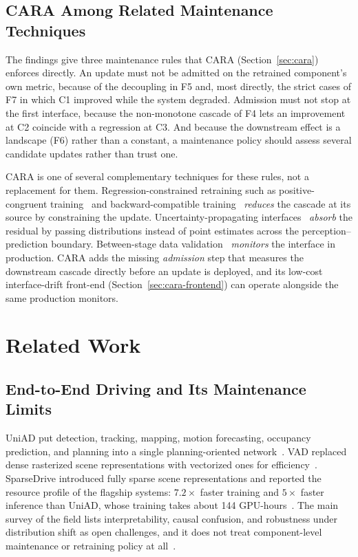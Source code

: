 \documentclass[conference]{IEEEtran}
\begin{document}
\subsection{CARA Among Related Maintenance Techniques}
The findings give three maintenance rules that CARA (Section~\ref{sec:cara})
enforces directly. An update must not be admitted on the retrained component's
own metric, because of the decoupling in F5 and, most directly, the strict cases
of F7 in which C1 improved while the system degraded.
Admission must not stop at the first interface, because the non-monotone cascade
of F4 lets an improvement at C2 coincide with a regression at C3. And because the
downstream effect is a landscape (F6) rather than a constant, a maintenance
policy should assess several candidate updates rather than trust one.

CARA is one of several complementary techniques for these rules, not a
replacement for them. Regression-constrained retraining such as
positive-congruent training~\cite{yan2021pctraining} and backward-compatible
training~\cite{shen2020bct} \emph{reduces} the cascade at its source by
constraining the update. Uncertainty-propagating
interfaces~\cite{ivanovic2022propagating} \emph{absorb} the residual by passing
distributions instead of point estimates across the perception--prediction
boundary. Between-stage data validation~\cite{breck2019data} \emph{monitors} the
interface in production. CARA adds the missing \emph{admission} step that measures
the downstream cascade directly before an update is deployed, and its low-cost
interface-drift front-end (Section~\ref{sec:cara-frontend}) can operate alongside
the same production monitors.

\section{Related Work}
\label{sec:related}

\subsection{End-to-End Driving and Its Maintenance Limits}
UniAD put detection, tracking, mapping, motion forecasting, occupancy
prediction, and planning into a single planning-oriented
network~\cite{hu2023uniad}. VAD replaced dense rasterized scene
representations with vectorized ones for efficiency~\cite{jiang2023vad}.
SparseDrive introduced fully sparse scene representations and reported the
resource profile of the flagship systems: $7.2\times$ faster training and
$5\times$ faster inference than UniAD, whose training takes about 144
GPU-hours~\cite{sun2024sparsedrive}. The main survey of the field lists
interpretability, causal confusion, and robustness under distribution shift
as open challenges, and it does not treat component-level maintenance or
retraining policy at all~\cite{chen2024e2esurvey}.
\end{document}
